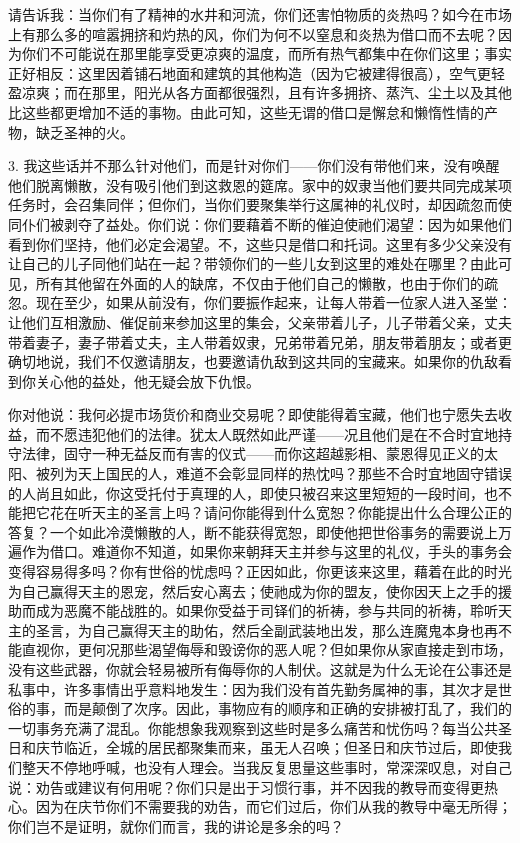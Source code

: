 请告诉我：当你们有了精神的水井和河流，你们还害怕物质的炎热吗？如今在市场上有那么多的喧嚣拥挤和灼热的风，你们为何不以窒息和炎热为借口而不去呢？因为你们不可能说在那里能享受更凉爽的温度，而所有热气都集中在你们这里；事实正好相反：这里因着铺石地面和建筑的其他构造（因为它被建得很高），空气更轻盈凉爽；而在那里，阳光从各方面都很强烈，且有许多拥挤、蒸汽、尘土以及其他比这些都更增加不适的事物。由此可知，这些无谓的借口是懈怠和懒惰性情的产物，缺乏圣神的火。\par

3. 我这些话并不那么针对他们，而是针对你们——你们没有带他们来，没有唤醒他们脱离懒散，没有吸引他们到这救恩的筵席。家中的奴隶当他们要共同完成某项任务时，会召集同伴；但你们，当你们要聚集举行这属神的礼仪时，却因疏忽而使同仆们被剥夺了益处。你们说：你们要藉着不断的催迫使祂们渴望：因为如果他们看到你们坚持，他们必定会渴望。不，这些只是借口和托词。这里有多少父亲没有让自己的儿子同他们站在一起？带领你们的一些儿女到这里的难处在哪里？由此可见，所有其他留在外面的人的缺席，不仅由于他们自己的懒散，也由于你们的疏忽。现在至少，如果从前没有，你们要振作起来，让每人带着一位家人进入圣堂：让他们互相激励、催促前来参加这里的集会，父亲带着儿子，儿子带着父亲，丈夫带着妻子，妻子带着丈夫，主人带着奴隶，兄弟带着兄弟，朋友带着朋友；或者更确切地说，我们不仅邀请朋友，也要邀请仇敌到这共同的宝藏来。如果你的仇敌看到你关心他的益处，他无疑会放下仇恨。\par

你对他说：我何必提市场货价和商业交易呢？即使能得着宝藏，他们也宁愿失去收益，而不愿违犯他们的法律。犹太人既然如此严谨——况且他们是在不合时宜地持守法律，固守一种无益反而有害的仪式——而你这超越影相、蒙恩得见正义的太阳、被列为天上国民的人，难道不会彰显同样的热忱吗？那些不合时宜地固守错误的人尚且如此，你这受托付于真理的人，即使只被召来这里短短的一段时间，也不能把它花在听天主的圣言上吗？请问你能得到什么宽恕？你能提出什么合理公正的答复？一个如此冷漠懒散的人，断不能获得宽恕，即使他把世俗事务的需要说上万遍作为借口。难道你不知道，如果你来朝拜天主并参与这里的礼仪，手头的事务会变得容易得多吗？你有世俗的忧虑吗？正因如此，你更该来这里，藉着在此的时光为自己赢得天主的恩宠，然后安心离去；使祂成为你的盟友，使你因天上之手的援助而成为恶魔不能战胜的。如果你受益于司铎们的祈祷，参与共同的祈祷，聆听天主的圣言，为自己赢得天主的助佑，然后全副武装地出发，那么连魔鬼本身也再不能直视你，更何况那些渴望侮辱和毁谤你的恶人呢？但如果你从家直接走到市场，没有这些武器，你就会轻易被所有侮辱你的人制伏。这就是为什么无论在公事还是私事中，许多事情出乎意料地发生：因为我们没有首先勤务属神的事，其次才是世俗的事，而是颠倒了次序。因此，事物应有的顺序和正确的安排被打乱了，我们的一切事务充满了混乱。你能想象我观察到这些时是多么痛苦和忧伤吗？每当公共圣日和庆节临近，全城的居民都聚集而来，虽无人召唤；但圣日和庆节过后，即使我们整天不停地呼喊，也没有人理会。当我反复思量这些事时，常深深叹息，对自己说：劝告或建议有何用呢？你们只是出于习惯行事，并不因我的教导而变得更热心。因为在庆节你们不需要我的劝告，而它们过后，你们从我的教导中毫无所得；你们岂不是证明，就你们而言，我的讲论是多余的吗？\par

